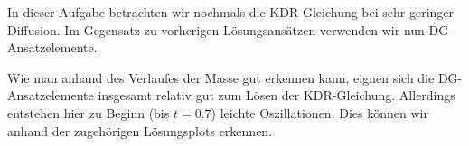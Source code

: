 In dieser Aufgabe betrachten wir nochmals die KDR-Gleichung bei sehr geringer Diffusion. Im Gegensatz zu vorherigen Lösungsansätzen verwenden wir nun DG-Ansatzelemente.

\begin{figure}[H]
	\centering
\end{figure}

Wie man anhand des Verlaufes der Masse gut erkennen kann, eignen sich die DG-Ansatzelemente insgesamt relativ gut zum Lösen der KDR-Gleichung. Allerdings entstehen hier zu Beginn (bis $t=0.7$) leichte Oszillationen. Dies können wir anhand der zugehörigen Lösungsplots erkennen.

\begin{figure}[H]
	\centering
\end{figure}